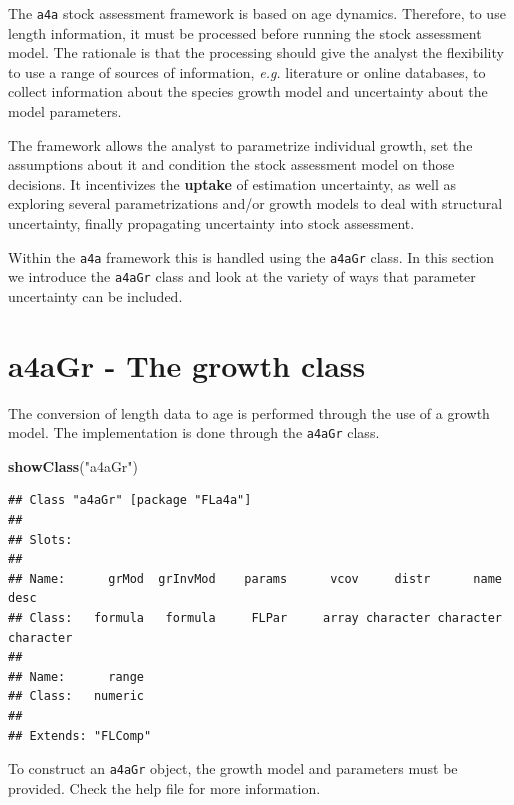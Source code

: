 \documentclass[
]{book}
\newenvironment{Shaded}{\begin{snugshade}}{\end{snugshade}}
\newcommand{\FunctionTok}[1]{\textcolor[rgb]{0.13,0.29,0.53}{\textbf{#1}}}
\newcommand{\NormalTok}[1]{#1}
\newcommand{\StringTok}[1]{\textcolor[rgb]{0.31,0.60,0.02}{#1}}
\begin{document}
The \texttt{a4a} stock assessment framework is based on age dynamics. Therefore, to use length information, it must be processed before running the stock assessment model. The rationale is that the processing should give the analyst the flexibility to use a range of sources of information, \emph{e.g.} literature or online databases, to collect information about the species growth model and uncertainty about the model parameters.

The framework allows the analyst to parametrize individual growth, set the assumptions about it and condition the stock assessment model on those decisions. It incentivizes the \textbf{uptake} of estimation uncertainty, as well as exploring several parametrizations and/or growth models to deal with structural uncertainty, finally propagating uncertainty into stock assessment.

Within the \texttt{a4a} framework this is handled using the \texttt{a4aGr} class. In this section we introduce the \texttt{a4aGr} class and look at the variety of ways that parameter uncertainty can be included.

\hypertarget{a4agr---the-growth-class}{%
\section{a4aGr - The growth class}\label{a4agr---the-growth-class}}

The conversion of length data to age is performed through the use of a growth model. The implementation is done through the \texttt{a4aGr} class.

\begin{Shaded}
\begin{Highlighting}[]
\FunctionTok{showClass}\NormalTok{(}\StringTok{"a4aGr"}\NormalTok{)}
\end{Highlighting}
\end{Shaded}

\begin{verbatim}
## Class "a4aGr" [package "FLa4a"]
## 
## Slots:
##                                                                             
## Name:      grMod  grInvMod    params      vcov     distr      name      desc
## Class:   formula   formula     FLPar     array character character character
##                 
## Name:      range
## Class:   numeric
## 
## Extends: "FLComp"
\end{verbatim}

To construct an \texttt{a4aGr} object, the growth model and parameters must be provided. Check the help file for more information.
\end{document}
